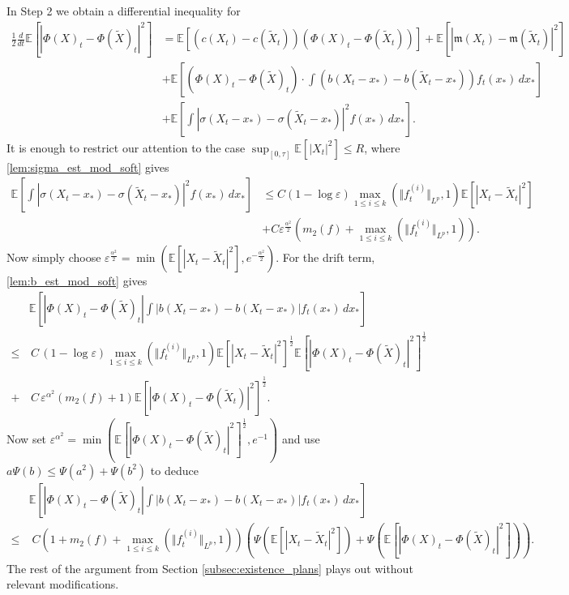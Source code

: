 \documentclass[10pt,oneside]{amsart}
\numberwithin{equation}{section}
\numberwithin{definition}{section}
\numberwithin{theorem}{section}
\numberwithin{lemma}{section}
\begin{document}
In Step 2 we obtain a differential inequality for
%
\begin{align*}
  \frac{1}{2}\frac{d}{dt}\mathbb{E}\left[|\Phi(X)_{t}-\Phi(\tilde{X})_{t}|^{2}\right] &
  =\mathbb{E}\left[\left(c(X_{t})-c(\tilde{X}_{t})\right)\left(\Phi(X)_{t}-\Phi(\tilde{X}_{t})\right)\right]
  +\mathbb{E}\left[|\mathfrak m(X_{t})-\mathfrak m(\tilde{X}_{t})|^{2}\right]	\\
  & +\mathbb{E}\left[\left(\Phi(X)_{t}-\Phi(\tilde{X})_{t}\right)\cdot\int\left(b(X_{t}-x_{*})-b(\tilde{X}_{t}-x_{*})\right)f_{t}(x_{*})\,dx_{*}\right]\\
  & +\mathbb{E}\left[\int|\sigma(X_{t}-x_{*})-\sigma(\tilde{X}_{t}-x_{*})|^{2}f(x_{*})\,dx_{*}\right].
\end{align*}
%
It is enough to restrict our attention to the case $\sup_{[0,\tau]}\mathbb E[|X_t|^2]\leq R$, where \cref{lem:sigma_est_mod_soft} gives
%
\begin{align*}
  \mathbb{E}\left[\int\left|\sigma(X_{t}-x_{*})-\sigma(\tilde{X}_{t}-x_{*})\right|^{2}f(x_{*})\,dx_{*}\right]&
  \leq C(1-\log\varepsilon)\max_{1\leq i\leq k}(\Vert f_{t}^{(i)}\Vert_{L^{p}},1)\mathbb{E}\left[|X_{t}-\tilde{X}_{t}|^{2}\right]\\
  &+C\varepsilon^{\frac{\alpha^{2}}{2}}\left(m_{2}(f)+\max_{1\leq i\leq k}(\Vert f_{t}^{(i)}\Vert_{L^{p}},1)\right).
\end{align*}
%
Now simply choose $\varepsilon^{\frac{\alpha^{2}}{2}}=\min\left(\mathbb{E}\left[|X_{t}-\tilde{X}_{t}|^{2}\right],e^{-\frac{\alpha^{2}}{2}}\right)$. For the drift term, \cref{lem:b_est_mod_soft} gives
%
\begin{align*}
  &\mathbb{E}\left[|\Phi(X)_{t}-\Phi(\tilde{X})_{t}|\int|b(X_{t}-x_{*})-b(X_{t}-x_{*})|f_{t}(x_{*})\,dx_{*}\right]	\\
  \leq & \,C\,(1-\log\varepsilon)\max_{1\leq i\leq k}(\Vert f_{t}^{(i)}\Vert_{L^{p}},1)\mathbb{E}\left[|X_{t}-\tilde{X}_{t}|^{2}\right]^{\frac{1}{2}}\mathbb{E}\left[|\Phi(X)_{t}-\Phi(\tilde{X})_{t}|^{2}\right]^{\frac{1}{2}}\\
  +& \,C\,\varepsilon^{\alpha^{2}}\left(m_{2}(f)+1\right)\mathbb{E}\left[|\Phi(X)_{t}-\Phi(\tilde{X}_{t})|^{2}\right]^{\frac{1}{2}}.
\end{align*}
%
Now set $\varepsilon^{\alpha^{2}}=\min\left(\mathbb{E}\left[|\Phi(X)_{t}-\Phi(\tilde{X})_{t}|^{2}\right]^{\frac{1}{2}},e^{-1}\right)$ and use $a\Psi(b)\leq\Psi(a^{2})+\Psi(b^{2})$ to deduce
%
\begin{align*}
  &\mathbb{E}\left[|\Phi(X)_{t}-\Phi(\tilde{X})_{t}|\int|b(X_{t}-x_{*})-b(X_{t}-x_{*})|f_{t}(x_{*})\,dx_{*}\right]\\
  \leq&\;C\left(1+m_{2}(f)+\max_{1\leq i\leq k}(\Vert f_{t}^{(i)}\Vert_{L^{p}},1)\right)
  \left(\Psi\left(\mathbb{E}\left[|X_{t}-\tilde{X}_{t}|^{2}\right]\right)+\Psi\left(\mathbb{E}\left[|\Phi(X)_{t}-\Phi(\tilde{X})_{t}|^{2}\right]\right)\right).
\end{align*}
%
The rest of the argument from Section \ref{subsec:existence_plans} plays out without relevant modifications.
\end{document}
